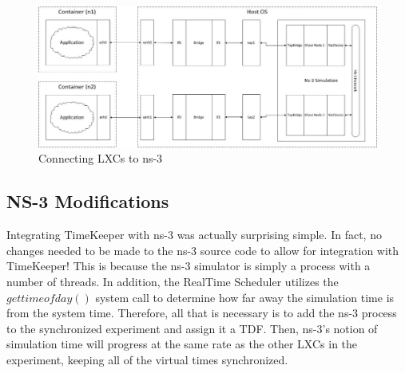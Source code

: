 \begin{itemize}
\begin{figure}[t] 
      \includegraphics[width=\textwidth]{images/ns3internals.eps} 
    \caption{Connecting LXCs to ns-3} 
    \label{fig:ns3internals}
  \end{figure}
        \end{itemize}
\subsection{NS-3 Modifications}
Integrating TimeKeeper with ns-3 was actually surprising simple. In fact, no changes needed to be made to the ns-3 source code to allow for integration with TimeKeeper! This is because the ns-3 simulator is simply a process with a number of threads. In addition, the RealTime Scheduler utilizes the $gettimeofday()$ system call to determine how far away the simulation time is from the system time. Therefore,  all that is necessary is to add the ns-3 process to the synchronized experiment and assign it a TDF. Then, ns-3's notion of simulation time will progress at the same rate as the other LXCs in the experiment, keeping all of the virtual times synchronized.
